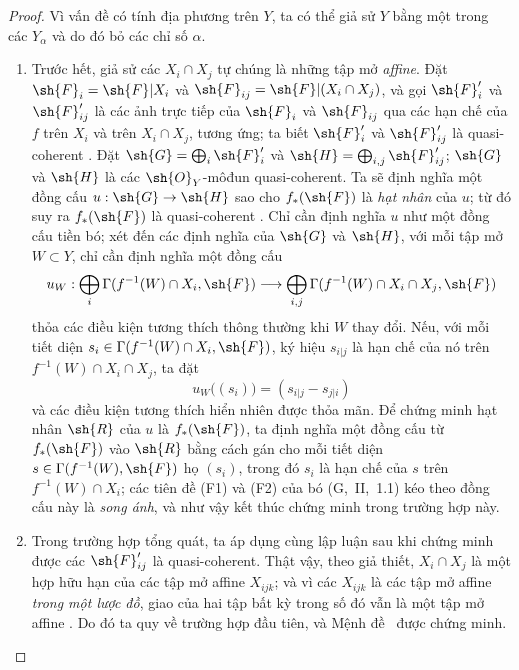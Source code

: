 \documentclass[oneside]{amsart}
\makeatletter
\newcommand{\ega@arrow}[2]{\mathchoice{#1}{#2}{#2}{#2}}
\renewcommand{\to}{\ega@arrow{\longrightarrow}{\rightarrow}}
\newcommand{\oldpage}[2][]{{\marginnote{\normalfont\textbf{#1}~|~#2}}\ignorespaces}
\makeatother
\begin{document}
\begin{proof}
Vì vấn đề có tính địa phương trên $Y$, ta có thể giả sử $Y$ bằng một
trong các $Y_\alpha$ và do đó bỏ các chỉ số $\alpha$.
\begin{enumerate}
  \item[(a)] Trước hết, giả sử các $X_i\cap X_j$ tự chúng là những tập
    mở \emph{affine}. Đặt $\sh{F}_i=\sh{F}|X_i$ và
    $\sh{F}_{ij}=\sh{F}|(X_i\cap X_j)$, và gọi $\sh{F}'_i$ và
    $\sh{F}'_{ij}$ là các ảnh trực tiếp của $\sh{F}_i$ và
    $\sh{F}_{ij}$ qua các hạn chế của $f$ trên $X_i$ và trên
    $X_i\cap X_j$, tương ứng; ta biết $\sh{F}'_i$ và $\sh{F}'_{ij}$
    là quasi-coherent . Đặt
    $\sh{G}=\bigoplus_i\sh{F}'_i$ và
    $\sh{H}=\bigoplus_{i,j}\sh{F}'_{ij}$; $\sh{G}$ và $\sh{H}$ là các
    $\sh{O}_Y$-môđun quasi-coherent. Ta sẽ định nghĩa một đồng cấu
    $u:\sh{G}\to\sh{H}$ sao cho $f_*(\sh{F})$ là \emph{hạt nhân} của
    $u$; từ đó suy ra $f_*(\sh{F})$ là quasi-coherent
    . Chỉ cần định nghĩa $u$
\oldpage[I]{172}
    như một đồng cấu tiền bó; xét đến các định nghĩa của $\sh{G}$ và
    $\sh{H}$, với mỗi tập mở $W\subset Y$, chỉ cần định nghĩa một đồng
    cấu
    \[
      u_W:\bigoplus_i\Gamma(f^{-1}(W)\cap X_i,\sh{F})\to
      \bigoplus_{i,j}\Gamma(f^{-1}(W)\cap X_i\cap X_j,\sh{F})
    \]
    thỏa các điều kiện tương thích thông thường khi $W$ thay đổi. Nếu,
    với mỗi tiết diện $s_i\in\Gamma(f^{-1}(W)\cap X_i,\sh{F})$, ký hiệu
    $s_{i|j}$ là hạn chế của nó trên
    $f^{-1}(W)\cap X_i\cap X_j$, ta đặt
    \[
      u_W\big((s_i)\big)=(s_{i|j}-s_{j|i})
    \]
    và các điều kiện tương thích hiển nhiên được thỏa mãn. Để chứng
    minh hạt nhân $\sh{R}$ của $u$ là $f_*(\sh{F})$, ta định nghĩa một
    đồng cấu từ $f_*(\sh{F})$ vào $\sh{R}$ bằng cách gán cho mỗi tiết
    diện $s\in\Gamma(f^{-1}(W),\sh{F})$ họ $(s_i)$, trong đó $s_i$ là
    hạn chế của $s$ trên $f^{-1}(W)\cap X_i$; các tiên đề (F1) và (F2)
    của bó (G,~II,~1.1) kéo theo đồng cấu này là \emph{song ánh}, và
    như vậy kết thúc chứng minh trong trường hợp này.
  \item[(b)] Trong trường hợp tổng quát, ta áp dụng cùng lập luận sau
    khi chứng minh được các $\sh{F}'_{ij}$ là quasi-coherent. Thật vậy,
    theo giả thiết, $X_i\cap X_j$ là một hợp hữu hạn của các tập mở
    affine $X_{ijk}$; và vì các $X_{ijk}$ là các tập mở affine
    \emph{trong một lược đồ}, giao của hai tập bất kỳ trong số đó vẫn
    là một tập mở affine . Do đó ta quy về trường hợp đầu
    tiên, và Mệnh đề~ được chứng minh.
\end{enumerate}
\end{proof}
\end{document}
